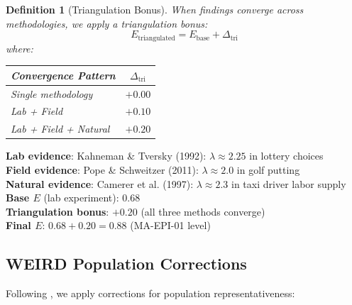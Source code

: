 \documentclass[11pt,a4paper]{article}
\newtheorem{definition}{Definition}[section]
\begin{document}
\begin{definition}[Triangulation Bonus]
\label{def:triangulation}
When findings converge across methodologies, we apply a triangulation bonus:
\begin{equation}
E_{\text{triangulated}} = E_{\text{base}} + \Delta_{\text{tri}}
\end{equation}
where:
\begin{center}
\begin{tabular}{lc}
\toprule
\textbf{Convergence Pattern} & $\Delta_{\text{tri}}$ \\
\midrule
Single methodology & $+0.00$ \\
Lab + Field & $+0.10$ \\
Lab + Field + Natural & $+0.20$ \\
\bottomrule
\end{tabular}
\end{center}
\end{definition}

\begin{practicalbox}[title={Example: Loss Aversion Triangulation}]
\textbf{Lab evidence}: Kahneman \& Tversky (1992): $\lambda \approx 2.25$ in lottery choices \\
\textbf{Field evidence}: Pope \& Schweitzer (2011): $\lambda \approx 2.0$ in golf putting \\
\textbf{Natural evidence}: Camerer et al. (1997): $\lambda \approx 2.3$ in taxi driver labor supply \\[0.5em]
\textbf{Base $E$} (lab experiment): 0.68 \\
\textbf{Triangulation bonus}: $+0.20$ (all three methods converge) \\
\textbf{Final $E$}: $0.68 + 0.20 = 0.88$ (MA-EPI-01 level)
\end{practicalbox}

\subsection{WEIRD Population Corrections}

Following \citet{Henrich2010}, we apply corrections for population representativeness:
\end{document}
